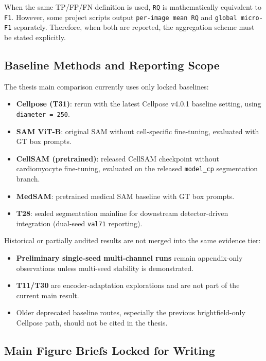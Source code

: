 When the same TP/FP/FN definition is used, \texttt{RQ} is mathematically equivalent to \texttt{F1}. However, some project scripts output \texttt{per-image\ mean\ RQ} and \texttt{global\ micro-F1} separately. Therefore, when both are reported, the aggregation scheme must be stated explicitly.

\subsection{Baseline Methods and Reporting Scope}\label{baseline-methods-and-reporting-scope}

The thesis main comparison currently uses only locked baselines:

\begin{itemize}
\tightlist
\item
  \textbf{Cellpose (T31)}: rerun with the latest Cellpose v4.0.1 baseline setting, using \texttt{diameter\ =\ 250}.
\item
  \textbf{SAM ViT-B}: original SAM without cell-specific fine-tuning, evaluated with GT box prompts.
\item
  \textbf{CellSAM (pretrained)}: released CellSAM checkpoint without cardiomyocyte fine-tuning, evaluated on the released \texttt{model\_cp} segmentation branch.
\item
  \textbf{MedSAM}: pretrained medical SAM baseline with GT box prompts.
\item
  \textbf{T28}: sealed segmentation mainline for downstream detector-driven integration (dual-seed \texttt{val71} reporting).
\end{itemize}

Historical or partially audited results are not merged into the same evidence tier:

\begin{itemize}
\tightlist
\item
  \textbf{Preliminary single-seed multi-channel runs} remain appendix-only observations unless multi-seed stability is demonstrated.
\item
  \textbf{T11/T30} are encoder-adaptation explorations and are not part of the current main result.
\item
  Older deprecated baseline routes, especially the previous brightfield-only Cellpose path, should not be cited in the thesis.
\end{itemize}

\subsection{Main Figure Briefs Locked for Writing}\label{main-figure-briefs-locked-for-writing}

